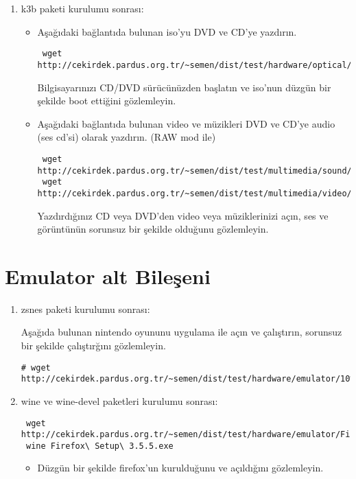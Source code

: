 \documentclass[a4paper,10pt]{article}
\begin{document}
\begin{enumerate}
\item k3b paketi kurulumu sonrası:
\begin{itemize}
\item Aşağıdaki bağlantıda bulunan iso'yu DVD ve CD'ye yazdırın. 
\begin{verbatim}
 wget http://cekirdek.pardus.org.tr/~semen/dist/test/hardware/optical/boot.iso
\end{verbatim}

Bilgisayarınızı CD/DVD sürücünüzden başlatın ve iso'nun düzgün bir şekilde boot ettiğini gözlemleyin.

\item Aşağıdaki bağlantıda bulunan video ve müzikleri DVD ve CD'ye audio (ses cd'si) olarak yazdırın. (RAW mod ile)
\begin{verbatim}
 wget http://cekirdek.pardus.org.tr/~semen/dist/test/multimedia/sound/sound.tar
 wget http://cekirdek.pardus.org.tr/~semen/dist/test/multimedia/video/cokluortam.tar
\end{verbatim}
Yazdırdığınız CD veya DVD'den video veya müziklerinizi açın, ses ve görüntünün sorunsuz bir şekilde olduğunu gözlemleyin.

\end{itemize}

\end{enumerate}
\section{Emulator alt Bileşeni}
\begin{enumerate}
 \item zsnes paketi kurulumu sonrası:

Aşağıda bulunan nintendo oyununu uygulama ile açın ve çalıştırın, sorunsuz bir şekilde çalıştırğını gözlemleyin.
\begin{verbatim}
# wget http://cekirdek.pardus.org.tr/~semen/dist/test/hardware/emulator/10%20Yard%20Fight%20(A&S%20NES%20Hack).smc 
\end{verbatim}

 \item wine ve wine-devel paketleri kurulumu sonrası:
\begin{verbatim}
 wget http://cekirdek.pardus.org.tr/~semen/dist/test/hardware/emulator/Firefox%20Setup%203.5.5.exe
 wine Firefox\ Setup\ 3.5.5.exe
\end{verbatim}
\begin{itemize}
 \item Düzgün bir şekilde firefox'un kurulduğunu ve açıldığını gözlemleyin.
 \end{itemize}

\end{enumerate}
\end{document}
